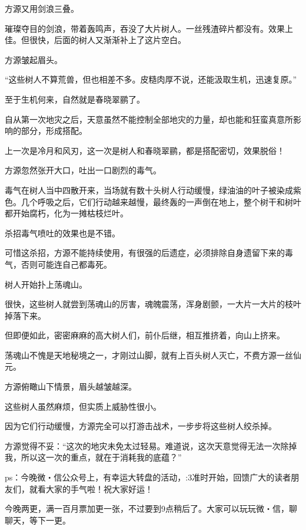\begin{this_body}
方源又用剑浪三叠。

璀璨夺目的剑浪，带着轰鸣声，吞没了大片树人。一丝残渣碎片都没有。效果上佳。但很快，后面的树人又渐渐补上了这片空白。

方源皱起眉头。

“这些树人不算荒兽，但也相差不多。皮糙肉厚不说，还能汲取生机，迅速复原。”

至于生机何来，自然就是春晓翠鹂了。

自从第一次地灾之后，天意虽然不能控制全部地灾的力量，却也能和狂蛮真意所影响的部分，形成搭配。

上一次是冷月和风刃，这一次是树人和春晓翠鹂，都是搭配密切，效果脱俗！

方源忽然张开大口，吐出一口剧烈的毒气。

毒气在树人当中四散开来，当场就有数十头树人行动缓慢，绿油油的叶子被染成紫色。几个呼吸之后，它们行动越来越慢，最终轰的一声倒在地上，整个树干和树叶都开始腐朽，化为一摊枯枝烂叶。

杀招毒气喷吐的效果也是不错。

可惜这杀招，方源不能持续使用，有很强的后遗症，必须排除自身遗留下来的毒气，否则可能连自己都毒死。

树人开始扑上荡魂山。

很快，这些树人就尝到荡魂山的厉害，魂魄震荡，浑身剧颤，一大片一大片的枝叶掉落下来。

但即便如此，密密麻麻的高大树人们，前仆后继，相互推挤着，向山上挤来。

荡魂山不愧是天地秘境之一，才刚过山脚，就有上百头树人灭亡，不费方源一丝仙元。

方源俯瞰山下情景，眉头越皱越深。

这些树人虽然麻烦，但实质上威胁性很小。

因为它们行动缓慢，方源完全可以打游击战术，一步步将这些树人绞杀掉。

方源觉得不妥：“这次的地灾未免太过轻易。难道说，这次天意觉得无法一次除掉我，所以这一次的重点，就在于消耗我的底蕴？”

ps：今晚微・信公众号上，有幸运大转盘的活动，:3准时开始，回馈广大的读者朋友们，就看大家的手气啦！祝大家好运！

今晚两更，满一百月票加更一张，不过要到9点稍后了。大家可以玩玩微・信，聊聊天，等下一更。

\end{this_body}

